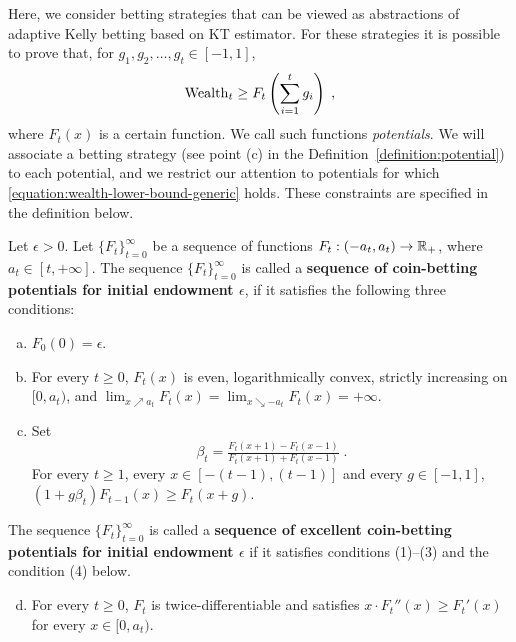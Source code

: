 Here, we consider betting strategies that can be viewed as abstractions of
adaptive Kelly betting based on KT estimator. For these strategies it is
possible to prove that, for $g_1, g_2, \dots, g_t \in [-1,1]$,
\begin{equation}
\label{equation:wealth-lower-bound-generic}
\operatorname{Wealth}_t \ge F_t \left( \sum_{i=1}^t g_i \right) \; ,
\end{equation}
where $F_t(x)$ is a certain function. We call such functions \emph{potentials}.
We will associate a betting strategy (see point (c) in the Definition~\ref{definition:potential}) to each potential,
and we restrict our
attention to potentials for which \eqref{equation:wealth-lower-bound-generic}
holds. These constraints are specified in the definition below.
\begin{definition}
\label{definition:potential}
Let $\epsilon > 0$. Let $\{F_t\}_{t=0}^\infty$ be a sequence of functions
$F_t:(-a_t, a_t)  \to \mathbb{R}_+$, where $a_t \in [t, +\infty]$.  The sequence
$\{F_t\}_{t=0}^\infty$ is called a \textbf{sequence of coin-betting potentials
for initial endowment $\epsilon$}, if it satisfies the following three
conditions:
\begin{enumerate}[(a)]
\item $F_0(0) = \epsilon$.

\item For every $t \ge 0$, $F_t(x)$ is even, logarithmically convex, strictly
increasing on $[0,a_t)$, and
$\lim_{x \nearrow a_t} F_t(x) = \lim_{x \searrow -a_t} F_t(x) = +\infty$.
\item Set 
\begin{equation}
\label{equation:potential-based-strategy}
\beta_t=\tfrac{F_t(x + 1) - F_t(x - 1)}{F_t(x + 1) + F_t(x - 1)} \;.
\end{equation}
For every $t \ge 1$, every $x \in [-(t-1), (t-1)]$ and every $g \in [-1,1]$, $\left(1 + g \beta_t \right) F_{t-1}(x) \ge F_t(x+g)$.
\end{enumerate}
The sequence $\{F_t\}_{t=0}^\infty$ is called a
\textbf{sequence of excellent coin-betting potentials for initial
endowment $\epsilon$} if it satisfies conditions (1)--(3) and the condition (4)
below.
\begin{enumerate}[(a)]
\setcounter{enumi}{3}
\item For every $t \ge 0$, $F_t$ is twice-differentiable and
satisfies $x \cdot F_t''(x) \ge F_t'(x)$ for every $x \in [0,a_t)$.
\end{enumerate}
\end{definition}

